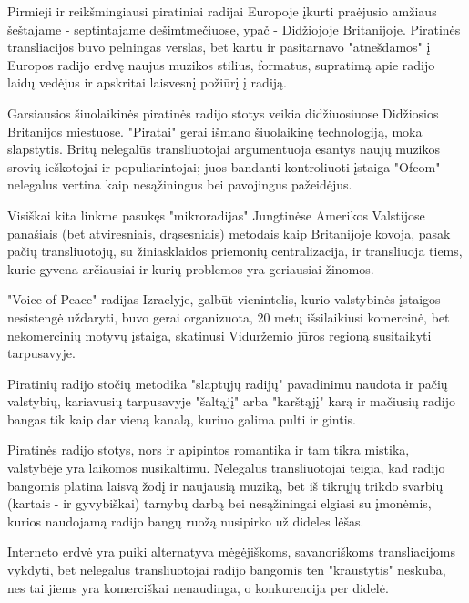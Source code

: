 \documentclass[kursinis-darbas]{vukf}
\begin{document}
%
%

\vukfConclusion


Pirmieji ir reikšmingiausi piratiniai radijai Europoje įkurti praėjusio amžiaus šeštajame - septintajame dešimtmečiuose, ypač - Didžiojoje Britanijoje. Piratinės transliacijos buvo pelningas verslas, bet kartu ir pasitarnavo "atnešdamos" į Europos radijo erdvę naujus muzikos stilius, formatus, supratimą apie radijo laidų vedėjus ir apskritai laisvesnį požiūrį į radiją.

Garsiausios šiuolaikinės piratinės radijo stotys veikia didžiuosiuose Didžiosios Britanijos miestuose. "Piratai" gerai išmano šiuolaikinę technologiją, moka slapstytis. Britų nelegalūs transliuotojai argumentuoja esantys naujų muzikos srovių ieškotojai ir populiarintojai; juos bandanti kontroliuoti įstaiga "Ofcom" nelegalus vertina kaip nesąžiningus bei pavojingus pažeidėjus.

Visiškai kita linkme pasukęs "mikroradijas" Jungtinėse Amerikos Valstijose panašiais (bet atviresniais, drąsesniais) metodais kaip Britanijoje kovoja, pasak pačių transliuotojų, su žiniasklaidos priemonių centralizacija, ir transliuoja tiems, kurie gyvena arčiausiai ir kurių problemos yra geriausiai žinomos.

"Voice of Peace" radijas Izraelyje, galbūt vienintelis, kurio valstybinės įstaigos nesistengė uždaryti, buvo gerai organizuota, 20 metų išsilaikiusi komercinė, bet nekomercinių motyvų įstaiga, skatinusi Viduržemio jūros regioną susitaikyti tarpusavyje.

Piratinių radijo stočių metodika "slaptųjų radijų" pavadinimu naudota ir pačių valstybių, kariavusių tarpusavyje "šaltąjį" arba "karštąjį" karą ir mačiusių radijo bangas tik kaip dar vieną kanalą, kuriuo galima pulti ir gintis.

Piratinės radijo stotys, nors ir apipintos romantika ir tam tikra mistika, valstybėje yra laikomos nusikaltimu. Nelegalūs transliuotojai teigia, kad radijo bangomis platina laisvą žodį ir naujausią muziką, bet iš tikrųjų trikdo svarbių (kartais - ir gyvybiškai) tarnybų darbą bei nesąžiningai elgiasi su įmonėmis, kurios naudojamą radijo bangų ruožą nusipirko už dideles lėšas.

Interneto erdvė yra puiki alternatyva mėgėjiškoms, savanoriškoms transliacijoms vykdyti, bet nelegalūs transliuotojai radijo bangomis ten "kraustytis" neskuba, nes tai jiems yra komerciškai nenaudinga, o konkurencija per didelė.


%
%


\end{document}
